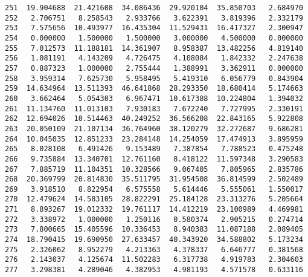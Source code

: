 \documentclass[11pt]{article}
\begin{document}
\begin{Verbatim}[commandchars=\\\{\}]
251  19.904688  21.421608  34.086436  29.920104  35.850703   2.684970   
252   2.706751   8.258543   2.933766   3.622391   3.819396   2.332179   
253   7.575656  10.493977  16.435304  11.529431  16.417327   2.300947   
254   0.000000   1.500000   1.500000   3.000000   4.500000   0.000000   
255   7.012573  11.188181  14.361907   8.958387  13.482256   4.819140   
256   1.081191   4.143209   4.726475   4.108084   1.842332   2.247638   
257   0.887323   1.000000   2.755444   1.388991   3.362911   0.000000   
258   3.959314   7.625730   5.958495   5.419310   6.056779   0.843904   
259  14.634964  13.511393  46.641868  28.293350  18.680414   5.174663   
260   3.662464   5.054303   6.967471  10.617388  10.224804   1.394032   
261  11.134760  11.013103   7.930183   7.672240   7.727995   2.330191   
262  12.694026  10.514463  40.249252  36.566208  22.843165   5.922808   
263  20.050109  21.107134  36.764960  38.120279  32.272687   9.686281   
264  10.045035  12.851233  23.284148  14.254059  17.474913   3.895959   
265   8.028108   6.491426   9.153489   7.387854   7.788523   0.475248   
266   9.735884  13.340701  12.761160   8.418122  11.597348   3.290583   
267   7.885719  11.104351  10.328566   9.067405   7.805965   2.835786   
268  20.369799  20.814830  35.511795  31.954508  36.814599   2.502489   
269   3.918510   8.822954   6.575558   5.614446   5.555061   1.550017   
270  12.479624  14.583105  28.822291  25.184128  23.313276   5.205664   
271   8.893267  19.012332  19.761117  14.412219  23.100989   4.469981   
272   3.338972   1.000000   1.250116   0.580374   2.905215   0.274714   
273   7.800665  15.405596  10.336453   8.940383  11.087188   2.089405   
274  18.790415  19.690950  27.633457  40.343920  34.588802   5.173234   
275   2.326062   8.952279   4.213363   4.378337   6.646777   0.381568   
276   2.143037   4.125674  11.502283   6.317738   4.919783   2.304603   
277   3.298381   4.289046   4.382953   4.981193   4.571578   0.633116   


\end{Verbatim}
\end{document}
